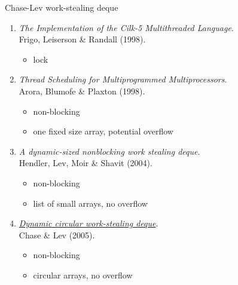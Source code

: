 \begin{frame}{Chase-Lev work-stealing deque}
\begin{enumerate}
	\item
		\textit{The Implementation of the Cilk-5 Multithreaded Language}. \\
		Frigo, Leiserson \& Randall (1998).
		\begin{itemize}
			\item lock
		\end{itemize}
	\item
		\textit{Thread Scheduling for Multiprogrammed Multiprocessors}. \\
		Arora, Blumofe \& Plaxton (1998).
		\begin{itemize}
			\item non-blocking
			\item one fixed size array, potential overflow
		\end{itemize}
	\item
		\textit{A dynamic-sized nonblocking work stealing deque}. \\
		Hendler, Lev, Moir \& Shavit (2004).
		\begin{itemize}
			\item non-blocking
			\item list of small arrays, no overflow
		\end{itemize}
	\item
		\underline{\textit{Dynamic circular work-stealing deque}}. \\
		Chase \& Lev (2005).
		\begin{itemize}
			\item non-blocking
			\item circular arrays, no overflow
		\end{itemize}
\end{enumerate}
\end{frame}